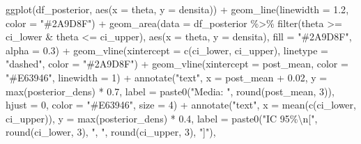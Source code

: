 \documentclass[
  letterpaper,
  DIV=11,
  numbers=noendperiod,
  oneside]{scrreprt}
\newenvironment{Shaded}{\begin{snugshade}}{\end{snugshade}}
\newcommand{\AttributeTok}[1]{\textcolor[rgb]{0.40,0.45,0.13}{#1}}
\newcommand{\DecValTok}[1]{\textcolor[rgb]{0.68,0.00,0.00}{#1}}
\newcommand{\FloatTok}[1]{\textcolor[rgb]{0.68,0.00,0.00}{#1}}
\newcommand{\FunctionTok}[1]{\textcolor[rgb]{0.28,0.35,0.67}{#1}}
\newcommand{\NormalTok}[1]{\textcolor[rgb]{0.00,0.23,0.31}{#1}}
\newcommand{\SpecialCharTok}[1]{\textcolor[rgb]{0.37,0.37,0.37}{#1}}
\newcommand{\StringTok}[1]{\textcolor[rgb]{0.13,0.47,0.30}{#1}}
\theoremstyle{definition}
\theoremstyle{plain}
\theoremstyle{definition}
\theoremstyle{remark}
\begin{document}
\begin{Shaded}
\begin{Highlighting}[]
\FunctionTok{ggplot}\NormalTok{(df\_posterior, }\FunctionTok{aes}\NormalTok{(}\AttributeTok{x =}\NormalTok{ theta, }\AttributeTok{y =}\NormalTok{ densita)) }\SpecialCharTok{+}
  \FunctionTok{geom\_line}\NormalTok{(}\AttributeTok{linewidth =} \FloatTok{1.2}\NormalTok{, }\AttributeTok{color =} \StringTok{"\#2A9D8F"}\NormalTok{) }\SpecialCharTok{+}
  \FunctionTok{geom\_area}\NormalTok{(}\AttributeTok{data =}\NormalTok{ df\_posterior }\SpecialCharTok{\%\textgreater{}\%} \FunctionTok{filter}\NormalTok{(theta }\SpecialCharTok{\textgreater{}=}\NormalTok{ ci\_lower }\SpecialCharTok{\&}\NormalTok{ theta }\SpecialCharTok{\textless{}=}\NormalTok{ ci\_upper),}
            \FunctionTok{aes}\NormalTok{(}\AttributeTok{x =}\NormalTok{ theta, }\AttributeTok{y =}\NormalTok{ densita), }\AttributeTok{fill =} \StringTok{"\#2A9D8F"}\NormalTok{, }\AttributeTok{alpha =} \FloatTok{0.3}\NormalTok{) }\SpecialCharTok{+}
  \FunctionTok{geom\_vline}\NormalTok{(}\AttributeTok{xintercept =} \FunctionTok{c}\NormalTok{(ci\_lower, ci\_upper), }\AttributeTok{linetype =} \StringTok{"dashed"}\NormalTok{, }\AttributeTok{color =} \StringTok{"\#2A9D8F"}\NormalTok{) }\SpecialCharTok{+}
  \FunctionTok{geom\_vline}\NormalTok{(}\AttributeTok{xintercept =}\NormalTok{ post\_mean, }\AttributeTok{color =} \StringTok{"\#E63946"}\NormalTok{, }\AttributeTok{linewidth =} \DecValTok{1}\NormalTok{) }\SpecialCharTok{+}
  \FunctionTok{annotate}\NormalTok{(}\StringTok{"text"}\NormalTok{, }\AttributeTok{x =}\NormalTok{ post\_mean }\SpecialCharTok{+} \FloatTok{0.02}\NormalTok{, }\AttributeTok{y =} \FunctionTok{max}\NormalTok{(posterior\_dens) }\SpecialCharTok{*} \FloatTok{0.7}\NormalTok{,}
           \AttributeTok{label =} \FunctionTok{paste0}\NormalTok{(}\StringTok{"Media: "}\NormalTok{, }\FunctionTok{round}\NormalTok{(post\_mean, }\DecValTok{3}\NormalTok{)), }
           \AttributeTok{hjust =} \DecValTok{0}\NormalTok{, }\AttributeTok{color =} \StringTok{"\#E63946"}\NormalTok{, }\AttributeTok{size =} \DecValTok{4}\NormalTok{) }\SpecialCharTok{+}
  \FunctionTok{annotate}\NormalTok{(}\StringTok{"text"}\NormalTok{, }\AttributeTok{x =} \FunctionTok{mean}\NormalTok{(}\FunctionTok{c}\NormalTok{(ci\_lower, ci\_upper)), }\AttributeTok{y =} \FunctionTok{max}\NormalTok{(posterior\_dens) }\SpecialCharTok{*} \FloatTok{0.4}\NormalTok{,}
           \AttributeTok{label =} \FunctionTok{paste0}\NormalTok{(}\StringTok{"IC 95\%}\SpecialCharTok{\textbackslash{}n}\StringTok{["}\NormalTok{, }\FunctionTok{round}\NormalTok{(ci\_lower, }\DecValTok{3}\NormalTok{), }\StringTok{", "}\NormalTok{, }\FunctionTok{round}\NormalTok{(ci\_upper, }\DecValTok{3}\NormalTok{), }\StringTok{"]"}\NormalTok{),}

\end{Highlighting}
\end{Shaded}
\end{document}
